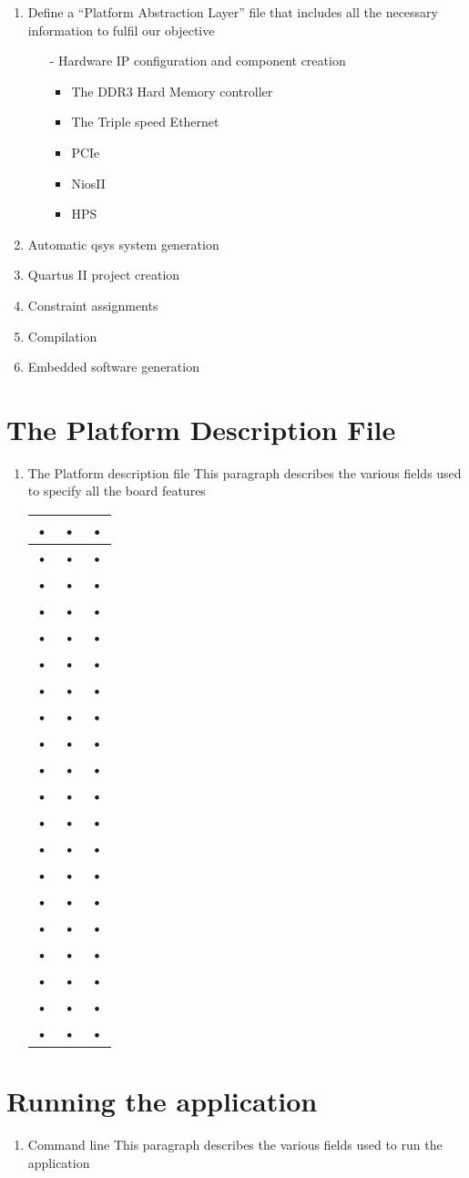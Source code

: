 \documentclass[a4paper]{article}
\begin{document}
\begin{enumerate}
\item Define a “Platform Abstraction Layer” file that includes all the necessary information to fulfil our objective
\begin{itemize}
	\item[-] Hardware IP configuration and component creation
	\begin{itemize}
		\item The DDR3 Hard Memory controller
		\item The Triple speed Ethernet
		\item PCIe
		\item NiosII
		\item HPS
		\end{itemize}
\end{itemize}
\item Automatic qsys system generation
\item Quartus II project creation
\item Constraint assignments
\item Compilation
\item Embedded software generation 
\end{enumerate}

\section { The Platform Description File}
\begin{enumerate}
\item The Platform description file
This paragraph describes the various fields used to specify all the board features

\begin{tabular}{|c|c|c|}
\hline 
• & • & • \\ 
\hline 
• & • & • \\ 
\hline 
• & • & • \\ 
\hline 
• & • & • \\ 
\hline 
• & • & • \\ 
\hline 
• & • & • \\ 
\hline 
• & • & • \\ 
\hline 
• & • & • \\ 
\hline 
• & • & • \\ 
\hline 
• & • & • \\ 
\hline 
• & • & • \\ 
\hline 
• & • & • \\ 
\hline 
• & • & • \\ 
\hline 
• & • & • \\ 
\hline 
• & • & • \\ 
\hline 
• & • & • \\ 
\hline 
• & • & • \\ 
\hline 
• & • & • \\ 
\hline 
• & • & • \\ 
\hline 
• & • & • \\ 
\hline 
\end{tabular} 
\end{enumerate}
\section { Running the application}
\begin{enumerate}
\item Command line
This paragraph describes the various fields used to run the application
\end{enumerate}
\end{document}
